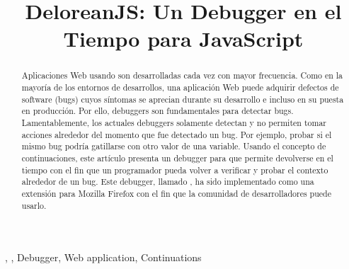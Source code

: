 \documentclass[conference]{IEEEtran}
\begin{document}
\title{DeloreanJS: Un Debugger en el Tiempo para JavaScript\\
}

\author{
\and
{}
\and
{}
}

\maketitle

\begin{abstract}
Aplicaciones Web usando \javascript son desarrolladas cada vez con mayor frecuencia. Como en la mayor\'ia de los entornos de desarrollos, una aplicaci\'on Web puede adquirir defectos de software (\aka bugs) cuyos s\'intomas se aprecian durante su desarrollo e incluso en su puesta en producci\'on. Por ello, debuggers son fundamentales para detectar bugs. Lamentablemente, los actuales debuggers solamente detectan y no permiten tomar acciones alrededor del momento que fue detectado un bug. Por ejemplo, probar si el mismo bug podr\'ia gatillarse con otro valor de una variable. Usando el concepto de continuaciones, este art\'iculo presenta un debugger para \javascript que permite devolverse en el tiempo con el fin que un programador pueda volver a verificar y probar el contexto alrededor de un bug. Este debugger, llamado \deloreanjs, ha sido implementado como una extensi\'on para Mozilla Firefox con el fin que la comunidad de desarrolladores puede usarlo.         
\end{abstract}

\begin{IEEEkeywords}
\deloreanjs, \javascript, Debugger, Web application, Continuations
\end{IEEEkeywords}
\end{document}
